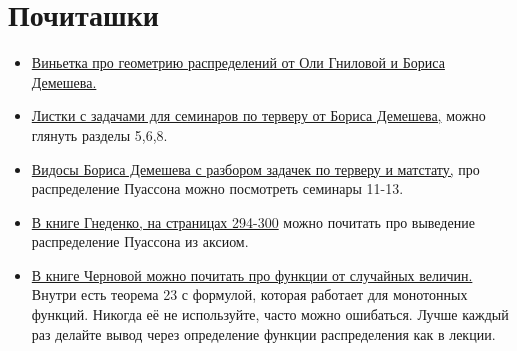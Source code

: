\documentclass[12pt, a4paper, oneside]{article}
\begin{document}
\section*{Почиташки} 

\begin{itemize} 
\item \href{https://github.com/olyagnilova/gauss-markov-pythagoras}{Виньетка про геометрию распределений от Оли Гниловой и Бориса Демешева.}
\item \href{https://github.com/bdemeshev/probability_pro}{Листки с задачами для семинаров по терверу от Бориса Демешева,} можно глянуть разделы 5,6,8.
\item \href{https://vimeo.com/showcase/2521777}{Видосы Бориса Демешева с разбором задачек по терверу и матстату,} про распределение Пуассона можно посмотреть семинары 11-13.
\item \href{https://yadi.sk/i/O4hwgm4Xxz05yQ}{В книге Гнеденко, на страницах 294-300} можно почитать про выведение распределение Пуассона из аксиом.
\item \href{https://tvims.nsu.ru/chernova/tv/lec/node32.html}{В книге Черновой можно почитать про функции от случайных величин.} Внутри есть теорема 23 с формулой, которая работает для монотонных функций. Никогда её не используйте, часто можно ошибаться. Лучше каждый раз делайте вывод через определение функции распределения как в лекции. 
\end{itemize} 
\end{document}
